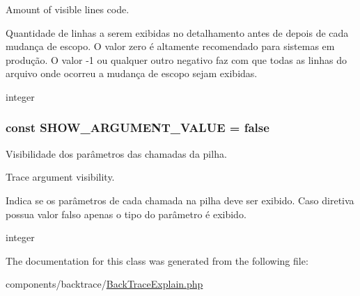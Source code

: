 Amount of visible lines code.

Quantidade de linhas a serem exibidas no detalhamento antes de depois de cada mudança de escopo. O valor zero é altamente recomendado para sistemas em produção. O valor -1 ou qualquer outro negativo faz com que todas as linhas do arquivo onde ocorreu a mudança de escopo sejam exibidas.

integer \hypertarget{class_back_trace_explain_51d167de814dda92b83aa6518e396fc3}{
\subsubsection[{SHOW\_\-ARGUMENT\_\-VALUE}]{\setlength{\rightskip}{0pt plus 5cm}const {\bf SHOW\_\-ARGUMENT\_\-VALUE} = false}}
\label{class_back_trace_explain_51d167de814dda92b83aa6518e396fc3}


Visibilidade dos parâmetros das chamadas da pilha.

Trace argument visibility.

Indica se os parâmetros de cada chamada na pilha deve ser exibido. Caso diretiva possua valor falso apenas o tipo do parâmetro é exibido.

integer 

The documentation for this class was generated from the following file:\begin{CompactItemize}
\item 
components/backtrace/\hyperlink{_back_trace_explain_8php}{BackTraceExplain.php}\end{CompactItemize}
